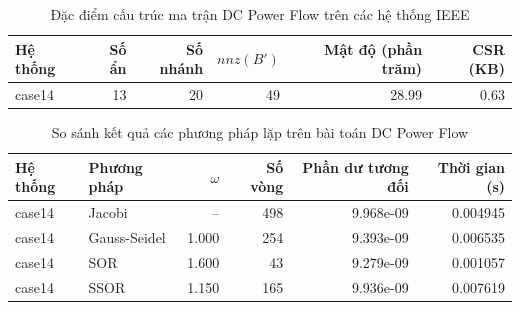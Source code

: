 \begin{table}[htbp]
\centering
\caption{Đặc điểm cấu trúc ma trận DC Power Flow trên các hệ thống IEEE}
\label{tab:dc-matrix-statistics}
\begin{tabular}{lrrrrr}
\hline
Hệ thống & Số ẩn & Số nhánh & $nnz(B')$ & Mật độ (phần trăm) & CSR (KB) \\
\hline
case14 & 13 & 20 & 49 & 28.99 & 0.63 \\
\hline
\end{tabular}
\end{table}

\begin{table}[htbp]
\centering
\caption{So sánh kết quả các phương pháp lặp trên bài toán DC Power Flow}
\label{tab:dc-solver-comparison}
\small
\begin{tabular}{llrrrr}
\hline
Hệ thống & Phương pháp & $\omega$ & Số vòng & Phần dư tương đối & Thời gian (s) \\
\hline
case14 & Jacobi & -- & 498 & 9.968e-09 & 0.004945 \\
case14 & Gauss-Seidel & 1.000 & 254 & 9.393e-09 & 0.006535 \\
case14 & SOR & 1.600 & 43 & 9.279e-09 & 0.001057 \\
case14 & SSOR & 1.150 & 165 & 9.936e-09 & 0.007619 \\
\hline
\end{tabular}
\end{table}
